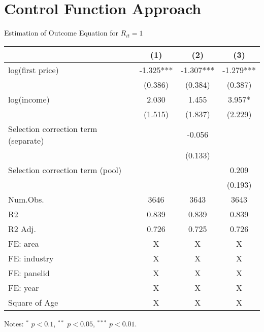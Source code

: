 \documentclass[
  ignorenonframetext,
  aspectratio=169,
]{beamer}
\begin{document}
\hypertarget{control-function-approach}{%
\section{Control Function Approach}\label{control-function-approach}}

\begin{frame}{Estimation of Outcome Equation for \(R_{it} = 1\)}
\protect\hypertarget{estimation-of-outcome-equation-for-r_it-1}{}
\begin{table}
\centering
\fontsize{7}{9}\selectfont
\begin{threeparttable}
\begin{tabular}[t]{lccc}
\toprule
  & (1) & (2) & (3)\\
\midrule
log(first price) & -1.325*** & -1.307*** & -1.279***\\
 & (0.386) & (0.384) & (0.387)\\
log(income) & 2.030 & 1.455 & 3.957*\\
 & (1.515) & (1.837) & (2.229)\\
Selection correction term (separate) &  & -0.056 & \\
 &  & (0.133) & \\
Selection correction term (pool) &  &  & 0.209\\
 &  &  & (0.193)\\
\midrule
Num.Obs. & 3646 & 3643 & 3643\\
R2 & 0.839 & 0.839 & 0.839\\
R2 Adj. & 0.726 & 0.725 & 0.726\\
FE: area & X & X & X\\
FE: industry & X & X & X\\
FE: panelid & X & X & X\\
FE: year & X & X & X\\
Square of Age & X & X & X\\
\bottomrule
\end{tabular}
\begin{tablenotes}
\item Notes: $^{*}$ $p < 0.1$, $^{**}$ $p < 0.05$, $^{***}$ $p < 0.01$.
\end{tablenotes}
\end{threeparttable}
\end{table}
\end{frame}
\end{document}
